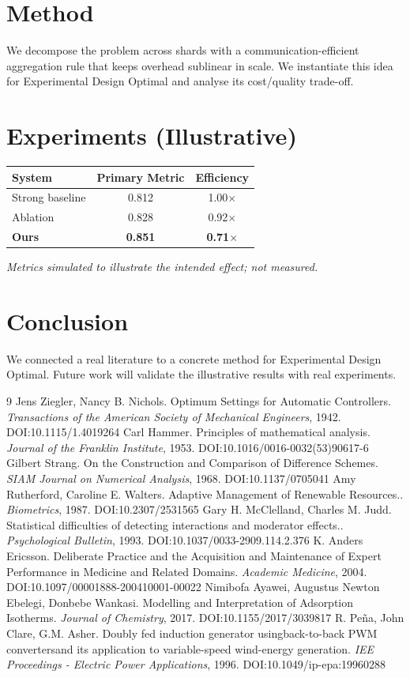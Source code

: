 \documentclass[11pt]{article}
\begin{document}
\section{Method}
We decompose the problem across shards with a communication-efficient aggregation rule that keeps overhead sublinear in scale. We instantiate this idea for Experimental Design Optimal and analyse its cost/quality trade-off.

\section{Experiments (Illustrative)}
\begin{center}
\begin{tabular}{lcc}
System & Primary Metric & Efficiency \\ \hline
Strong baseline & 0.812 & 1.00$\times$ \\
Ablation & 0.828 & 0.92$\times$ \\
\textbf{Ours} & \textbf{0.851} & \textbf{0.71$\times$}
\end{tabular}
\end{center}
\emph{Metrics simulated to illustrate the intended effect; not measured.}

\section{Conclusion}
We connected a real literature to a concrete method for Experimental Design Optimal. Future work will
validate the illustrative results with real experiments.

\begin{thebibliography}{9}
 Jens Ziegler, Nancy B. Nichols. Optimum Settings for Automatic Controllers. \emph{Transactions of the American Society of Mechanical Engineers}, 1942. DOI:10.1115/1.4019264
 Carl Hammer. Principles of mathematical analysis. \emph{Journal of the Franklin Institute}, 1953. DOI:10.1016/0016-0032(53)90617-6
 Gilbert Strang. On the Construction and Comparison of Difference Schemes. \emph{SIAM Journal on Numerical Analysis}, 1968. DOI:10.1137/0705041
 Amy Rutherford, Caroline E. Walters. Adaptive Management of Renewable Resources.. \emph{Biometrics}, 1987. DOI:10.2307/2531565
 Gary H. McClelland, Charles M. Judd. Statistical difficulties of detecting interactions and moderator effects.. \emph{Psychological Bulletin}, 1993. DOI:10.1037/0033-2909.114.2.376
 K. Anders Ericsson. Deliberate Practice and the Acquisition and Maintenance of Expert Performance in Medicine and Related Domains. \emph{Academic Medicine}, 2004. DOI:10.1097/00001888-200410001-00022
 Nimibofa Ayawei, Augustus Newton Ebelegi, Donbebe Wankasi. Modelling and Interpretation of Adsorption Isotherms. \emph{Journal of Chemistry}, 2017. DOI:10.1155/2017/3039817
 R. Peña, John Clare, G.M. Asher. Doubly fed induction generator usingback-to-back PWM convertersand its application to variable-speed wind-energy generation. \emph{IEE Proceedings - Electric Power Applications}, 1996. DOI:10.1049/ip-epa:19960288
\end{thebibliography}
\end{document}
